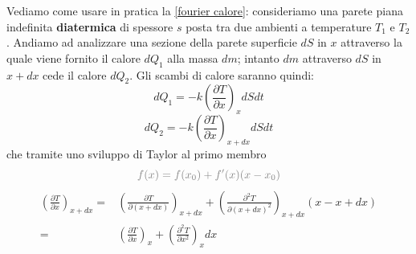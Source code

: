 \documentclass[x11names]{article}
\begin{document}
	\noindent
	Vediamo come usare in pratica la \ref{fourier calore}: consideriamo una parete piana indefinita \textbf{diatermica} di spessore \(s\) posta tra due ambienti a temperature \(T_1\) e \(T_2\). Andiamo ad analizzare una sezione della parete superficie \(dS\) in \(x\) attraverso la quale viene fornito il calore \(dQ_1\) alla massa \(dm\); intanto \(dm\) attraverso \(dS\) in \(x + dx\) cede il calore \(dQ_2\). Gli scambi di calore saranno quindi:
	\[ 
	dQ_1 = -k \left(\frac{\partial T}{\partial x}\right)_x dS dt
	\]
	\[ 
	dQ_2 = -k \left(\frac{\partial T}{\partial x}\right)_{x+dx} dS dt 
	\]
	che tramite uno sviluppo di Taylor al primo membro
	\[ 
	\textcolor{gray}{f(x) = f(x_0) + f'(x)(x-x_0)}
	\]
	\begin{align*}
		\left(\frac{\partial T}{\partial x}\right)_{x+dx} =& \left(\frac{\partial T}{\partial (x+dx)}\right)_{x+dx} + \left(\frac{\partial^2 T}{\partial (x + dx)^2}\right)_{x+dx}(x - x +dx) \\
		=& \left(\frac{\partial T}{\partial x}\right)_x + \left(\frac{\partial^2 T}{\partial x^2}\right)_{x}dx
	\end{align*}
	
\end{document}
